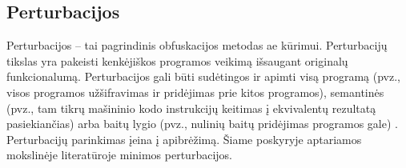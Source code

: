 \subsection{Perturbacijos}\label{sec:literature:perturbations}

Perturbacijos -- tai pagrindinis obfuskacijos metodas \gls{ae} kūrimui.
Perturbacijų tikslas yra pakeisti kenkėjiškos programos veikimą išsaugant
originalų funkcionalumą. Perturbacijos gali būti sudėtingos ir apimti visą
programą (pvz., visos programos užšifravimas ir pridėjimas prie kitos
programos), semantinės (pvz., tam tikrų mašininio kodo instrukcijų keitimas į
ekvivalentų rezultatą pasiekiančias) arba baitų lygio (pvz., nulinių baitų
pridėjimas programos gale) \cite{huGeneratingAdversarialMalware2017}. Perturbacijų parinkimas įeina į
 apibrėžimą. Šiame poskyryje aptariamos mokslinėje
literatūroje minimos perturbacijos.
